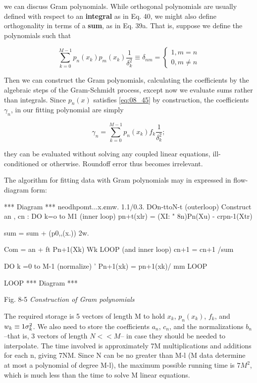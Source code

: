  we can discuss Gram polynomials. While orthogonal polynomials are usually defined with respect to an \textbf{integral} as in Eq. 40, we might also define orthogonality in terms of a \textbf{sum}, as in Eq. 39a. That is, suppose we define the polynomials such that

\begin{equation}\label{eq:08_45}
\sum_{k=0}^{M-1}p_{n}(x_{k})p_{m}(x_{k})\frac{1}{\delta_{k}^{2}} \equiv \delta_{nm} =
    \begin{cases}
        1, m   = n \\
        0, m \ne n 
    \end{cases}
\end{equation}

Then we can construct the Gram polynomials, calculating the
coefficients by the algebraic steps of the Gram-Schmidt process, except now we evaluate sums rather than integrals. Since $p_{n}(x)$ satisfies \ref{eq:08_45} by construction, the coefficients $\gamma_{n}$, in our fitting polynomial are simply

\begin{equation}
\gamma_{n} = \sum_{k=0}^{M-1} p_{n}(x_{k})f_{k}\frac{1}{\delta_{k}^{2}} ;
\end{equation}

they can be evaluated without solving any coupled linear equations, ill-conditioned or otherwise. Roundoff error thus becomes irrelevant.

The algorithm for fitting data with Gram polynomials may in expressed in flow-diagram form:

*** Diagram ***
neodhpomt...x.¢mw. 1.1/0.3.
DOn-ttoN-t (outerloop)
Construct an , cn :
DO k=o to M1 (inner loop)
pn+t(xlr) = (XI: " 8n)Pn(Xu) - crpn-1(Xtr)

sum = sum + (p0,,(x.)) 2w.

Com = an + ft Pn+1(Xk) Wk
LOOP (and inner loop)
cn+1 = cn+1 /sum

DO k =0 to M-1 (normalize)
’ Pn+1(xk) = pn+1(xk)/ mm
LOOP

LOOP
*** Diagram ***

Fig. 8-5 \textit{Construction of Gram polynomials}

The required storage is 5 vectors of length M to hold $x_{k}$, $p_{n}(x_{k})$, $f_{k}$, and $w_{k} \equiv 1\/\sigma_{k}^{2}$. We also need to store the coefficients $a_{n}$, $c_{n}$, and the normalizations $b_{n}$ --that is, 3 vectors of length $N<<M$-- in case they should be needed to interpolate. The time involved is approximately 7M multiplications and additions for each n, giving 7NM. Since N can be no greater than M-l (M data determine at most a polynomial of degree M-l), the maximum possible running time is $7M^{2}$, which is much less than the time to solve M linear equations.

